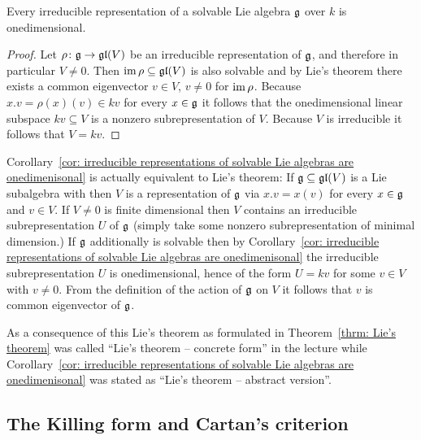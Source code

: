 \begin{cor}\label{cor: irreducible representations of solvable Lie algebras are onedimenisonal}
 Every irreducible representation of a solvable Lie algebra $\mathfrak{g}$ over $k$ is onedimensional.
\end{cor}
\begin{proof}
 Let $\rho \colon \mathfrak{g} \to \mathfrak{gl}(V)$ be an irreducible representation of $\mathfrak{g}$, and therefore in particular $V \neq 0$. Then $\operatorname{im} \rho \subseteq \mathfrak{gl}(V)$ is also solvable and by Lie’s theorem there exists a common eigenvector $v \in V$, $v \neq 0$ for $\operatorname{im} \rho$. Because $x.v = \rho(x)(v) \in kv$ for every $x \in \mathfrak{g}$ it follows that the onedimensional linear subspace $kv \subseteq V$ is a nonzero subrepresentation of $V$. Because $V$ is irreducible it follows that $V = kv$.
\end{proof}


\begin{rem}
 Corollary~\ref{cor: irreducible representations of solvable Lie algebras are onedimenisonal} is actually equivalent to Lie’s theorem: If $\mathfrak{g} \subseteq \mathfrak{gl}(V)$ is a Lie subalgebra with then $V$ is a representation of $\mathfrak{g}$ via $x.v = x(v)$ for every $x \in \mathfrak{g}$ and $v \in V$. If $V \neq 0$ is finite dimensional then $V$ contains an irreducible subrepresentation $U$ of $\mathfrak{g}$ (simply take some nonzero subrepresentation of minimal dimension.) If $\mathfrak{g}$ additionally is solvable then by Corollary~\ref{cor: irreducible representations of solvable Lie algebras are onedimenisonal} the irreducible subrepresentation $U$ is onedimensional, hence of the form $U = kv$ for some $v \in V$ with $v \neq 0$. From the definition of the action of $\mathfrak{g}$ on $V$ it follows that $v$ is common eigenvector of $\mathfrak{g}$.
 
 As a consequence of this Lie’s theorem as formulated in Theorem~\ref{thrm: Lie’s theorem} was called ``Lie’s theorem -- concrete form'' in the lecture while Corollary~\ref{cor: irreducible representations of solvable Lie algebras are onedimenisonal} was stated as ``Lie’s theorem -- abstract version''.
\end{rem}








\subsection{The Killing form and Cartan’s criterion}



